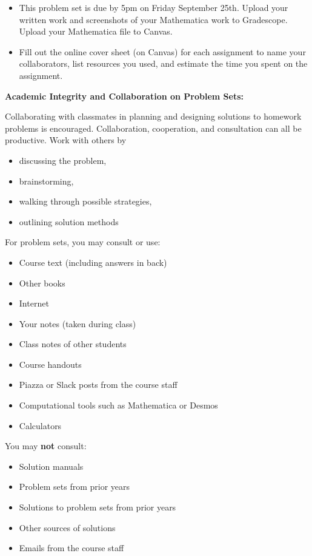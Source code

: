 \documentclass[12pt,letterpaper,noanswers]{exam}
\begin{document}
 \pdfpageheight 11in 
  \pdfpagewidth 8.5in
\begin{itemize}
\item This problem set is due by 5pm on Friday September 25th.  Upload your written work and screenshots of your Mathematica work to Gradescope.  Upload your Mathematica file to Canvas.
\item Fill out the online cover sheet (on Canvas) for each assignment to name your collaborators, list resources you used, and estimate the time you spent on the assignment.
\end{itemize}

\noindent\textbf{Academic Integrity and Collaboration on Problem Sets:}  

Collaborating with classmates in planning and designing solutions to homework problems is encouraged.  Collaboration, cooperation, and consultation can all be productive.  Work with others by 
\begin{multicols}{2}
\begin{itemize}
\itemsep-0.2em
    \item discussing the problem,
    \item brainstorming,
    \item walking through possible strategies,
    \item outlining solution methods
\end{itemize}   
\end{multicols}

\noindent For problem sets, you may consult or use:
\begin{multicols}{2}
\begin{itemize}
\itemsep-0.2em
    \item Course text (including answers in back)
    \item Other books
    \item Internet
    \item Your notes (taken during class)
    \item Class notes of other students
    \item Course handouts
    \item Piazza or Slack posts from the course staff
    \item Computational tools such as Mathematica or Desmos
    \item Calculators
\end{itemize}
\end{multicols}

\noindent You may \textbf{not} consult:
\begin{multicols}{2}
\begin{itemize}
\itemsep-0.2em
    \item Solution manuals
    \item Problem sets from prior years
    \item Solutions to problem sets from prior years
    \item Other sources of solutions
    \item Emails from the course staff
\end{itemize}
\end{multicols}
\end{document}
